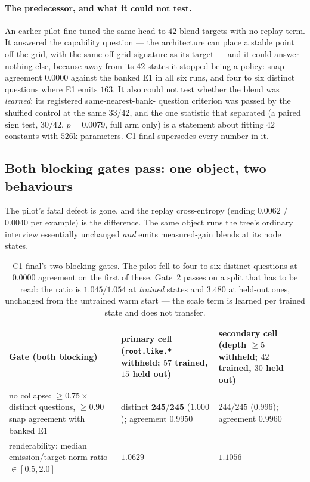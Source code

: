 \documentclass[11pt]{article}
\begin{document}
\paragraph{The predecessor, and what it could not test.} An earlier pilot fine-tuned the same head to
$42$ blend targets with no replay term. It answered the capability question --- the architecture can
place a stable point off the grid, with the same off-grid signature as its target --- and it could
answer nothing else, because away from its $42$ states it stopped being a policy: snap agreement
$0.0000$ against the banked E1 in all six runs, and four to six distinct questions where E1 emits
$163$. It also could not test whether the blend was \emph{learned}: its registered same-nearest-bank-
question criterion was passed by the shuffled control at the same $33/42$, and the one statistic that
separated (a paired sign test, $30/42$, $p=0.0079$, full arm only) is a statement about fitting $42$
constants with $526$k parameters. C1-final supersedes every number in it.

\subsection{Both blocking gates pass: one object, two behaviours}

The pilot's fatal defect is gone, and the replay cross-entropy (ending $0.0062$ / $0.0040$ per
example) is the difference. The same object runs the tree's ordinary interview essentially unchanged
\emph{and} emits measured-gain blends at its node states.

\begin{table}[h]
\centering\small
\begin{tabular}{@{}p{}p{}p{}@{}}
\toprule
\textbf{Gate (both blocking)} & \textbf{primary cell (\texttt{root.like.*} withheld; $57$ trained,
$15$ held out)} & \textbf{secondary cell (depth $\ge5$ withheld; $42$ trained, $30$ held out)} \\
\midrule
no collapse: $\ge0.75\times$ distinct questions, $\ge0.90$ snap agreement with banked E1 &
distinct $\mathbf{245/245}$ ($1.000$); agreement $\mathbf{0.9950}$ &
$244/245$ ($0.996$); agreement $\mathbf{0.9960}$ \\
renderability: median emission/target norm ratio $\in[0.5,2.0]$ & $\mathbf{1.0629}$ &
$\mathbf{1.1056}$ \\
\bottomrule
\end{tabular}
\caption{C1-final's two blocking gates. The pilot fell to four to six distinct questions at
$0.0000$ agreement on the first of these. Gate~2 passes on a split that has to be read: the ratio is
$1.045$/$1.054$ at \emph{trained} states and $3.480$ at held-out ones, unchanged from the untrained
warm start --- the scale term is learned per trained state and does not transfer.}
\label{tab:c1gates}
\end{table}
\end{document}
